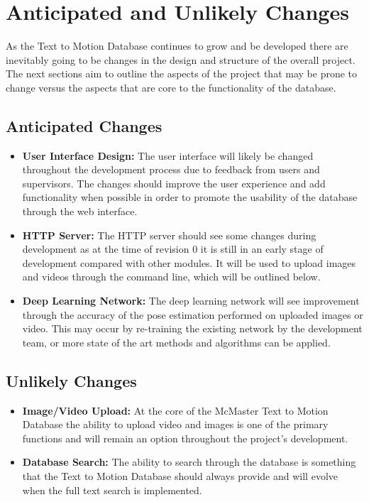 \documentclass{scrreprt}
\begin{document}
\chapter{Anticipated and Unlikely Changes}

As the Text to Motion Database continues to grow and be developed there are
inevitably going to be changes in the design and structure of the overall
project. The next sections aim to outline the aspects of the project that may
be prone to change versus the aspects that are core to the functionality of the
database.

\section{Anticipated Changes}

\begin{itemize}
    \item \textbf {User Interface Design:} The user interface will likely be
            changed throughout the development process due to feedback from
                  users and supervisors. The changes should improve the user
                  experience and add functionality when possible in order to
                  promote the usability of the database through the web
                  interface.
    \item \textbf {HTTP Server:} The HTTP server should see some changes during
            development as at the time of revision 0 it is still in an early
                  stage of development compared with other modules. It will be
                  used to upload images and videos through the command line,
                  which will be outlined below.
    \item \textbf{Deep Learning Network:} The deep learning network will see
            improvement through the accuracy of the pose estimation performed
                  on uploaded images or video. This may occur by re-training
                  the existing network by the development team, or more state
                  of the art methods and algorithms can be applied.
\end{itemize}

\section{Unlikely Changes}

\begin{itemize}
    \item \textbf {Image/Video Upload:} At the core of the McMaster Text to
            Motion Database the ability to upload video and images is one of
                  the primary functions and will remain an option throughout
                  the project's development.
    \item \textbf {Database Search:} The ability to search through the database
            is something that the Text to Motion Database should always provide
                  and will evolve when the full text search is implemented.
\end{itemize}
\end{document}
